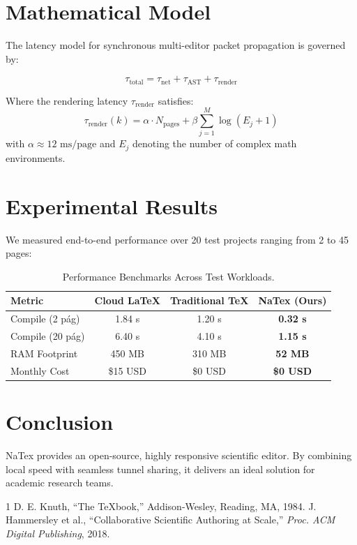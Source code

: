 \documentclass[10pt, twocolumn, letterpaper]{article}
\begin{document}
\section{Mathematical Model}
The latency model for synchronous multi-editor packet propagation is governed by:

\begin{equation}
  \tau_{\text{total}} = \tau_{\text{net}} + \tau_{\text{AST}} + \tau_{\text{render}}
\end{equation}

Where the rendering latency $\tau_{\text{render}}$ satisfies:
\begin{equation}
  \tau_{\text{render}}(k) = \alpha \cdot N_{\text{pages}} + \beta \sum_{j=1}^{M} \log(E_j + 1)
\end{equation}
with $\alpha \approx 12\text{ ms/page}$ and $E_j$ denoting the number of complex math environments.

\section{Experimental Results}
We measured end-to-end performance over 20 test projects ranging from 2 to 45 pages:

\begin{table}[h]
  \centering
  \caption{Performance Benchmarks Across Test Workloads.}
  \label{tab:benchmarks}
  \begin{tabular}{lccc}
    \toprule
    \textbf{Metric} & \textbf{Cloud LaTeX} & \textbf{Traditional TeX} & \textbf{NaTex (Ours)} \\
    \midrule
    Compile (2 pág) & 1.84 s & 1.20 s & \textbf{0.32 s} \\
    Compile (20 pág) & 6.40 s & 4.10 s & \textbf{1.15 s} \\
    RAM Footprint & 450 MB & 310 MB & \textbf{52 MB} \\
    Monthly Cost & \$15 USD & \$0 USD & \textbf{\$0 USD} \\
    \bottomrule
  \end{tabular}
\end{table}

\section{Conclusion}
NaTex provides an open-source, highly responsive scientific editor. By combining local speed with seamless tunnel sharing, it delivers an ideal solution for academic research teams.

\begin{thebibliography}{1}
 D. E. Knuth, ``The TeXbook,'' Addison-Wesley, Reading, MA, 1984.
 J. Hammersley et al., ``Collaborative Scientific Authoring at Scale,'' \textit{Proc. ACM Digital Publishing}, 2018.
\end{thebibliography}
\end{document}
